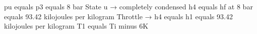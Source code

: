 pu equals p3 equals 8 bar  
State u → completely condensed  
h4 equals hf at 8 bar equals 93.42 kilojoules per kilogram  
Throttle → h4 equals h1 equals 93.42 kilojoules per kilogram  
T1 equals Ti minus 6K
